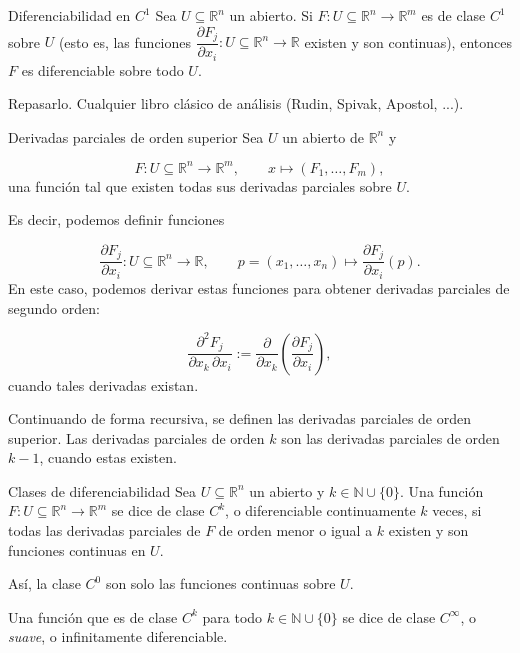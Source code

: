 \begin{booktheorem}{Diferenciabilidad en $C^1$}
Sea $U\subseteq \mathbb{R}^n$ un abierto. Si $F:U\subseteq \mathbb{R}^n\to \mathbb{R}^m$ es de clase $C^1$ sobre $U$ (esto es, las funciones $\dfrac{\partial F_j}{\partial x_i}:U\subseteq \mathbb{R}^n\to \mathbb{R}$ existen y son continuas), entonces $F$ es diferenciable sobre todo $U$.

\end{booktheorem}
\begin{bookproof}{}
Repasarlo. Cualquier libro clásico de análisis (Rudin, Spivak, Apostol, ...).

\bookqed
\end{bookproof}
\begin{bookdefinition}{Derivadas parciales de orden superior}
Sea $U$ un abierto de $\mathbb{R}^n$ y

\[
F:U\subseteq \mathbb{R}^n \longrightarrow \mathbb{R}^m,\qquad
x\longmapsto (F_1,\dots,F_m),
\]
una función tal que existen todas sus derivadas parciales sobre $U$.

Es decir, podemos definir funciones

\[
\frac{\partial F_j}{\partial x_i}:U\subseteq \mathbb{R}^n \longrightarrow \mathbb{R},
\qquad
p=(x_1,\dots,x_n)\longmapsto \frac{\partial F_j}{\partial x_i}(p).
\]
En este caso, podemos derivar estas funciones para obtener derivadas parciales de segundo orden:

\[
\frac{\partial^2 F_j}{\partial x_k\,\partial x_i}
:=
\frac{\partial}{\partial x_k}\left(\frac{\partial F_j}{\partial x_i}\right),
\]
cuando tales derivadas existan.

Continuando de forma recursiva, se definen las derivadas parciales de orden superior. Las derivadas parciales de orden $k$ son las derivadas parciales de orden $k-1$, cuando estas existen.

\end{bookdefinition}
\begin{bookdefinition}{Clases de diferenciabilidad}
Sea $U\subseteq \mathbb{R}^n$ un abierto y $k\in \mathbb{N}\cup\{0\}$. Una función $F:U\subseteq \mathbb{R}^n\to \mathbb{R}^m$ se dice de clase $C^k$, o diferenciable continuamente $k$ veces, si todas las derivadas parciales de $F$ de orden menor o igual a $k$ existen y son funciones continuas en $U$.

Así, la clase $C^0$ son solo las funciones continuas sobre $U$.

Una función que es de clase $C^k$ para todo $k\in \mathbb{N}\cup\{0\}$ se dice de clase $C^\infty$, o \emph{suave}, o infinitamente diferenciable.

\end{bookdefinition}
